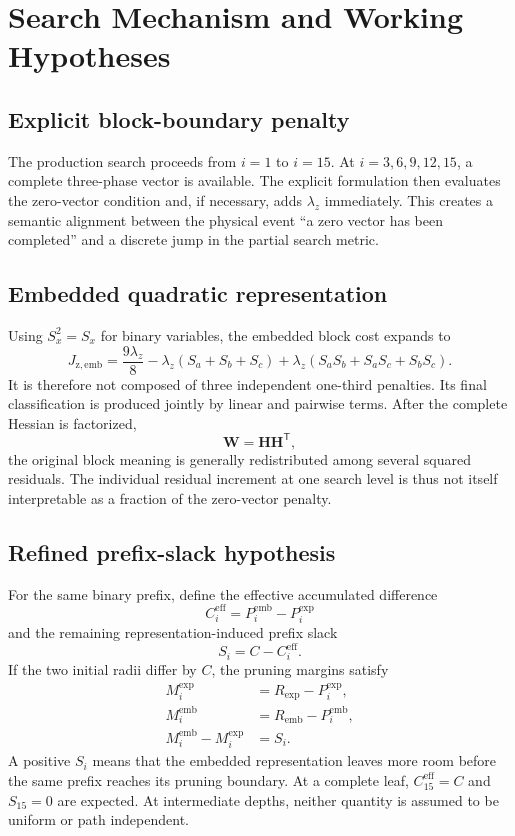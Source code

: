 \documentclass[paper=a4,oneside,fontsize=12pt,DIV=14,headings=normal,parskip=half,headsepline,numbers=noendperiod]{scrreprt}
\newcommand{\mat}[1]{\bm{#1}}
\newcommand{\T}{\mathsf{T}}
\begin{document}
\chapter{Search Mechanism and Working Hypotheses}

\section{Explicit block-boundary penalty}
The production search proceeds from $i=1$ to $i=15$.  At
$i=3,6,9,12,15$, a complete three-phase vector is available.  The explicit
formulation then evaluates the zero-vector condition and, if necessary, adds
$\lambda_z$ immediately.  This creates a semantic alignment between the
physical event ``a zero vector has been completed'' and a discrete jump in the
partial search metric.

\section{Embedded quadratic representation}
Using $S_x^2=S_x$ for binary variables, the embedded block cost expands to
\begin{equation}
 J_{\mathrm{z,emb}}
 =\frac{9\lambda_z}{8}
 -\lambda_z(S_a+S_b+S_c)
 +\lambda_z(S_aS_b+S_aS_c+S_bS_c).
\end{equation}
It is therefore not composed of three independent one-third penalties.  Its
final classification is produced jointly by linear and pairwise terms.  After
the complete Hessian is factorized,
\begin{equation}
 \mat W=\mat H\mat H^\T,
\end{equation}
the original block meaning is generally redistributed among several squared
residuals.  The individual residual increment at one search level is thus not
itself interpretable as a fraction of the zero-vector penalty.

\section{Refined prefix-slack hypothesis}
For the same binary prefix, define the effective accumulated difference
\begin{equation}
 C_i^{\mathrm{eff}}
 =P_i^{\mathrm{emb}}-P_i^{\mathrm{exp}}
 \label{eq:effective_offset}
\end{equation}
and the remaining representation-induced prefix slack
\begin{equation}
 S_i=C-C_i^{\mathrm{eff}}.
 \label{eq:prefix_slack}
\end{equation}
If the two initial radii differ by $C$, the pruning margins satisfy
\begin{align}
 M_i^{\mathrm{exp}}&=R_{\mathrm{exp}}-P_i^{\mathrm{exp}},\\
 M_i^{\mathrm{emb}}&=R_{\mathrm{emb}}-P_i^{\mathrm{emb}},\\
 M_i^{\mathrm{emb}}-M_i^{\mathrm{exp}}&=S_i.
\end{align}
A positive $S_i$ means that the embedded representation leaves more room
before the same prefix reaches its pruning boundary.  At a complete leaf,
$C_{15}^{\mathrm{eff}}=C$ and $S_{15}=0$ are expected.  At intermediate
depths, neither quantity is assumed to be uniform or path independent.
\end{document}
